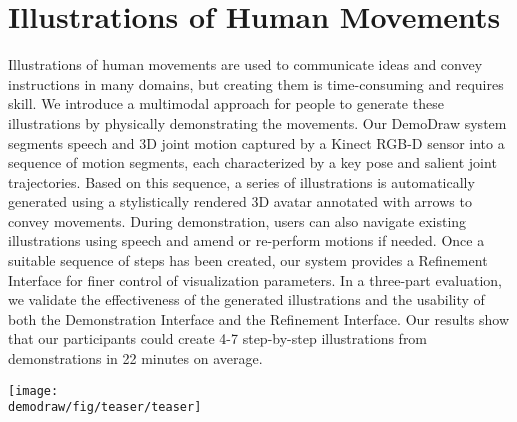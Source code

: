 
\chapter{
  Illustrations of Human Movements
}

\newcommand{\systemname}{DemoDraw}
\newcommand{\phaseI}{Demonstration Interface}
\newcommand{\phaseII}{Refinement Interface}

Illustrations of human movements are used to communicate ideas and convey instructions in many domains, but creating them is time-consuming and requires skill.
We introduce a multimodal approach for people to generate these illustrations by physically demonstrating the movements.
Our \systemname{} system segments speech and 3D joint motion captured by a Kinect RGB-D sensor into a sequence of motion segments, each characterized by a key pose and salient joint trajectories.
Based on this sequence, a series of illustrations is automatically generated using a stylistically rendered 3D avatar annotated with arrows to convey movements.
During demonstration, users can also navigate existing illustrations using speech and amend or re-perform motions if needed. Once a suitable sequence of steps has been created, our system provides a \phaseII{} for finer control of visualization parameters.
In a three-part evaluation, we validate the effectiveness of the generated illustrations and the usability of both the \phaseI{} and the \phaseII{}.
Our results show that our participants could create 4-7 step-by-step illustrations from demonstrations in 22 minutes on average.

\begin{figure*}[t]
  \centering
  \texttt{[image: \\demodraw/fig/teaser/teaser]}
  \caption{\systemname{}: (a) multi-modal ``\phaseI{}'' to capture motion, verify results, and re-perform portions if needed; (b) conventional \phaseII{} for refinement and exploring other visualization styles; (c-d) examples of illustration styles.}
  \label{fig:demodraw_teaser}
\end{figure*}









